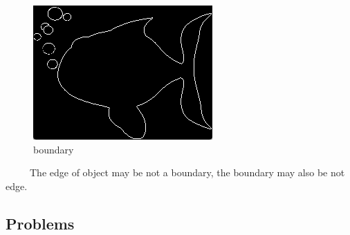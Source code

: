 \documentclass[notheorems,serif,table,compress]{beamer}  %
\begin{document}
\begin{frame}
\begin{tcolorbox}[colback=red!5,colframe=blue!75!black]
\begin{figure}
            \begin{minipage}[t]{0.3\linewidth}
            \centering
            \caption{boundary}
            \includegraphics[width=1\linewidth]{bounary.png} 
            \end{minipage}
        \end{figure}
    \end{tcolorbox}
~~~~~The edge of object may be not a boundary, the boundary may also be not edge.
\end{frame}
 
 
\subsection{Problems}
\end{document}
